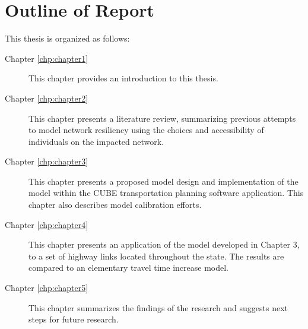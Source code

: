 \newpage
\section{Outline of Report}

\noindent This thesis is organized as follows:

\begin{description}
	\item [Chapter \ref{chp:chapter1}]	{This chapter provides an introduction to this thesis.}
	\item [Chapter \ref{chp:chapter2}]	{This chapter presents a literature review, summarizing previous attempts to model network resiliency using the choices and accessibility of individuals on the impacted network.}
	\item [Chapter \ref{chp:chapter3}]	{This chapter presents a proposed model design and implementation of the model within the CUBE transportation planning software application. This chapter also describes model calibration efforts.}
  \item [Chapter \ref{chp:chapter4}]	{This chapter presents an application of the model developed in Chapter 3, to a set of highway links located throughout the state. The results are compared to an elementary travel time increase model.}
	\item [Chapter \ref{chp:chapter5}]	{This chapter summarizes the findings of the research and suggests next steps for future research.}
\end{description}
